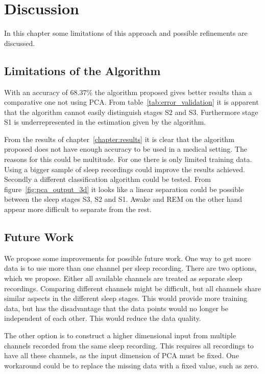 \chapter{Discussion}
\label{chapter:discussion}

In this chapter some limitations of this approach and possible refinements are discussed.

\section{Limitations of the Algorithm}

With an accuracy of $68.37\%$ the algorithm proposed gives better results than a comparative one not using PCA. From table~\ref{tab:error_validation} it is apparent that the algorithm cannot easily distinguish stages S2 and S3. Furthermore stage S1 is underrepresented in the estimation given by the algorithm.

From the results of chapter~\ref{chapter:results} it is clear that the algorithm proposed does not have enough accuracy to be used in a medical setting. The reasons for this could be multitude. For one there is only limited training data. Using a bigger sample of sleep recordings could improve the results achieved. Secondly a different classification algorithm could be tested. From figure~\ref{fig:pca_output_3d} it looks like a linear separation could be possible between the sleep stages S3, S2 and S1. Awake and REM on the other hand appear more difficult to separate from the rest.

\section{Future Work}
We propose some improvements for possible future work. One way to get more data is to use more than one channel per sleep recording. There are two options, which we propose. Either all available channels are treated as separate sleep recordings. Comparing different channels might be difficult, but all channels share similar aspects in the different sleep stages. This would provide more training data, but has the disadvantage that the data points would no longer be independent of each other. This would reduce the data quality.

The other option is to construct a higher dimensional input from multiple channels recorded from the same sleep recording. This requires all recordings to have all these channels, as the input dimension of PCA must be fixed. One workaround could be to replace the missing data with a fixed value, such as zero.

